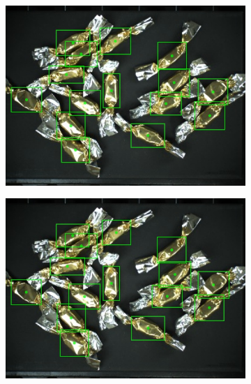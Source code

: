 \begin{figure}[ht]
\begin{subfigure}{0.5\textwidth}
  \end{subfigure}
  \begin{subfigure}{0.5\textwidth}
    \centering
    \includegraphics[width=0.92\linewidth]{Sources/Figures/appendix/actual_117.jpg}

  \end{subfigure}
  \begin{subfigure}{0.5\textwidth}
    \centering
    \includegraphics[width=0.92\linewidth]{Sources/Figures/appendix/pred_117.jpg}


\end{subfigure}
\end{figure}
